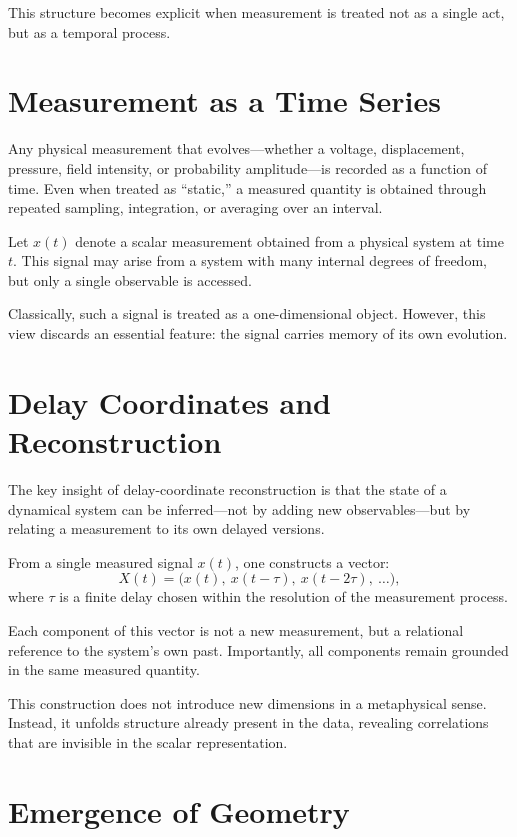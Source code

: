 \documentclass[12pt]{book}  %
\begin{document}
This structure becomes explicit when measurement is treated not as a single act, but as a temporal process.

\section*{Measurement as a Time Series}

Any physical measurement that evolves—whether a voltage, displacement, pressure, field intensity, or probability amplitude—is recorded as a function of time. Even when treated as “static,” a measured quantity is obtained through repeated sampling, integration, or averaging over an interval.

Let \( x(t) \) denote a scalar measurement obtained from a physical system at time \( t \). This signal may arise from a system with many internal degrees of freedom, but only a single observable is accessed.

Classically, such a signal is treated as a one-dimensional object. However, this view discards an essential feature: the signal carries memory of its own evolution.

\section*{Delay Coordinates and Reconstruction}

The key insight of delay-coordinate reconstruction is that the state of a dynamical system can be inferred—not by adding new observables—but by relating a measurement to its own delayed versions.

From a single measured signal \( x(t) \), one constructs a vector:
\[
X(t) = \bigl( x(t),\ x(t - \tau),\ x(t - 2\tau),\ \dots \bigr),
\]
where \( \tau \) is a finite delay chosen within the resolution of the measurement process.

Each component of this vector is not a new measurement, but a relational reference to the system’s own past. Importantly, all components remain grounded in the same measured quantity.

This construction does not introduce new dimensions in a metaphysical sense. Instead, it unfolds structure already present in the data, revealing correlations that are invisible in the scalar representation.

\section*{Emergence of Geometry}
\end{document}
